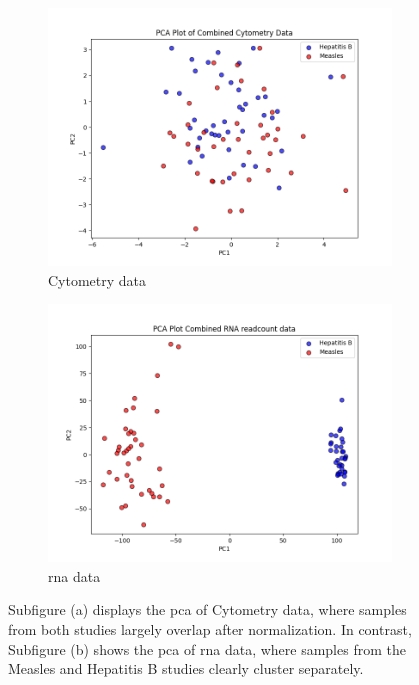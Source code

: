 \documentclass[12pt,a4paper]{report}
\begin{document}
\begin{figure}[H]
    \centering

    \begin{subfigure}[b]{0.49\textwidth}
        \centering
        \includegraphics[width=\textwidth]{images/M&H_PCA_Ctyometry.png}
        \caption{Cytometry data}
        \label{fig:m&h_pca_cytometry}
    \end{subfigure}
    \hfill
    \begin{subfigure}[b]{0.49\textwidth}
        \centering
        \includegraphics[width=\linewidth]{images/M&H_PCA_RNA.png}
        \caption{\acrshort{rna} data}
        \label{fig:m&h_pca_rna}
    \end{subfigure}

    \caption[\gls{pca} of Multimodal Data from Measles and Hepatitis B Studies]{Subfigure (a) displays the \gls{pca} of Cytometry data, where samples from both studies largely overlap after normalization. In contrast, Subfigure (b) shows the \gls{pca} of \acrshort{rna} data, where samples from the Measles and Hepatitis B studies clearly cluster separately.}
    \label{fig:m&h_pca_both}
\end{figure}
\end{document}
